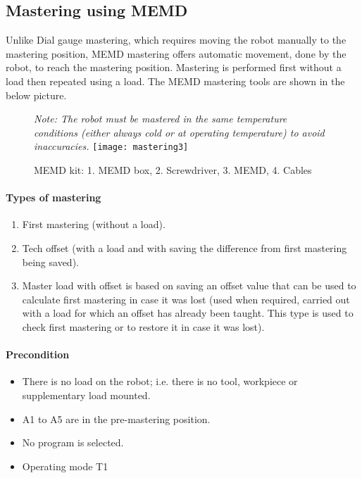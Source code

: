 		\subsection{Mastering using MEMD}
		Unlike Dial gauge mastering, which requires moving the robot manually to the mastering position, MEMD mastering offers automatic movement, done by the robot, to reach the mastering position. Mastering is performed first without a load then repeated using a load. The MEMD mastering tools are shown in the below picture.
			\begin{figure}[H]
            \centering
            \textit{Note: The robot must be mastered in the same temperature conditions (either always cold or at operating temperature) to avoid inaccuracies.}
			\texttt{[image: mastering3]}
			\caption{MEMD kit: 1. MEMD box, 2. Screwdriver, 3. MEMD, 4. Cables}
        \end{figure}
    
		\paragraph{Types of mastering}
		\begin{enumerate}
			\item First mastering (without a load).
			\item Tech offset (with a load and with saving the difference from first mastering being saved).
			\item Master load with offset is based on saving an offset value that can be used to calculate first mastering in case it was lost (used when required, carried out with a load for which an offset has already been taught. This type is used to check first mastering or to restore it in case it was lost).
		\end{enumerate}
		
		\paragraph{Precondition}
		\begin{itemize}
			\item There is no load on the robot; i.e. there is no tool, workpiece or supplementary load mounted.
			\item A1 to A5 are in the pre-mastering position.
			\item No program is selected.
			\item Operating mode T1
		\end{itemize}
		
